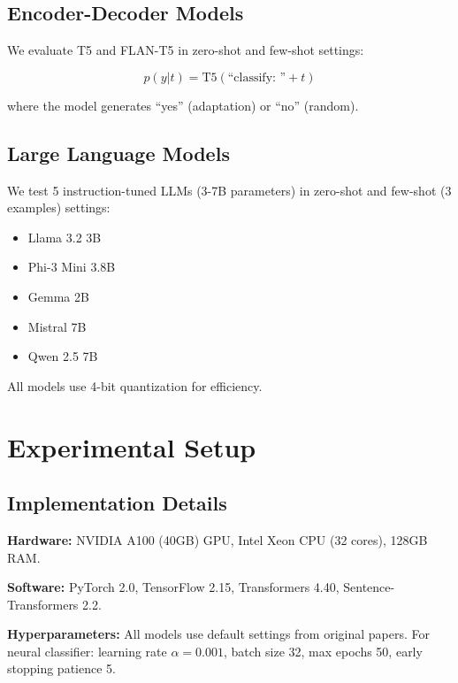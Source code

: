 \documentclass[11pt]{article}
\begin{document}
\subsection{Encoder-Decoder Models}

We evaluate T5 \cite{Raffel2020T5} and FLAN-T5 \cite{Chung2022FLAN} in zero-shot and few-shot settings:

\begin{equation}
p(y | t) = \text{T5}(\text{``classify: ''} + t)
\end{equation}

where the model generates ``yes'' (adaptation) or ``no'' (random).

\subsection{Large Language Models}

We test 5 instruction-tuned LLMs (3-7B parameters) in zero-shot and few-shot (3 examples) settings:

\begin{itemize}
    \item Llama 3.2 3B \cite{MetaAI2024Llama}
    \item Phi-3 Mini 3.8B \cite{Microsoft2024Phi3}
    \item Gemma 2B \cite{Google2024Gemma}
    \item Mistral 7B \cite{Jiang2023Mistral}
    \item Qwen 2.5 7B \cite{Alibaba2024Qwen}
\end{itemize}

All models use 4-bit quantization \cite{Dettmers2023QLoRA} for efficiency.

\section{Experimental Setup}

\subsection{Implementation Details}

\textbf{Hardware:} NVIDIA A100 (40GB) GPU, Intel Xeon CPU (32 cores), 128GB RAM.

\textbf{Software:} PyTorch 2.0, TensorFlow 2.15, Transformers 4.40, Sentence-Transformers 2.2.

\textbf{Hyperparameters:} All models use default settings from original papers. For neural classifier: learning rate $\alpha=0.001$, batch size 32, max epochs 50, early stopping patience 5.
\end{document}
